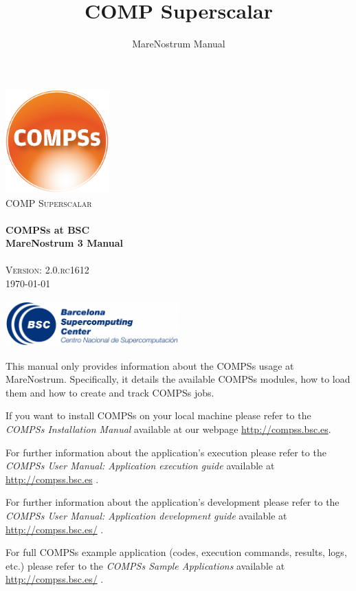 \documentclass[a4paper,12pt]{article}
\title{COMP Superscalar}
\author{MareNostrum Manual}
\def \compssversion {2.0.rc1612}
\begin{document}
  \hypersetup{pageanchor=false}
  \begin{titlepage} 
    \begin{center} 
      \includegraphics[width=0.3\textwidth]{./Figures/Logos/degradado-naranja-compss.jpg}~\\[1cm] 
      \textsc{\LARGE COMP Superscalar}\\[1.5cm] 
      
      \HRule \\[0.4cm] 
      { \huge \bfseries COMPSs at BSC \\[0.4cm] }
      { \large \bfseries MareNostrum 3 Manual \\[0.4cm] } 
      \HRule \\[1.5cm] 

      { \large \textsc{Version: \compssversion}} \\[0.3cm]
      { \large \today } 
      
      \vfill 
      \includegraphics[width=0.5\textwidth]{./Figures/bsc_280.jpg}~\\[1cm]
    \end{center} 
  \end{titlepage}
  \hypersetup{pageanchor=true}
  
  {
    This manual only provides information about the COMPSs usage at MareNostrum. Specifically, it details the available COMPSs modules,
    how to load them and how to create and track COMPSs jobs. 
    \newline
    
    If you want to install COMPSs on your local machine please refer to the \textit{COMPSs Installation Manual} available at our
    webpage \url{http://compss.bsc.es}.
    
    For further information about the application's execution please refer to the \textit{COMPSs User Manual: Application execution
    guide} available at \url{http://compss.bsc.es} .
    
    For further information about the application's development please refer to the \textit{COMPSs User Manual: Application development
    guide} available at \url{http://compss.bsc.es/} .
    
    For full COMPSs example application (codes, execution commands, results, logs, etc.) please refer to the \textit{COMPSs Sample 
    Applications} available at \url{http://compss.bsc.es/} .
  }
  
\end{document}
